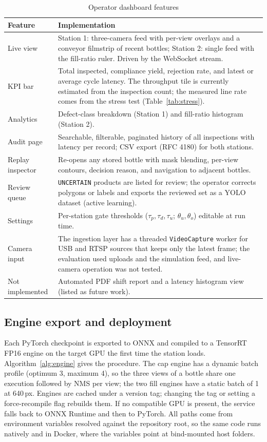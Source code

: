 \begin{table}[htbp]
\centering
\caption{Operator dashboard features}
\label{tab:dashboard}
\footnotesize
\begin{tabularx}{\textwidth}{|p{3.2cm}|X|}
\hline
\textbf{Feature} & \textbf{Implementation} \\ \hline
Live view & Station 1: three-camera feed with per-view overlays and a conveyor filmstrip of recent bottles; Station 2: single feed with the fill-ratio ruler. Driven by the WebSocket stream. \\ \hline
KPI bar & Total inspected, compliance yield, rejection rate, and latest or average cycle latency. The throughput tile is currently estimated from the inspection count; the measured line rate comes from the stress test (Table~\ref{tab:stress}). \\ \hline
Analytics & Defect-class breakdown (Station 1) and fill-ratio histogram (Station 2). \\ \hline
Audit page & Searchable, filterable, paginated history of all inspections with latency per record; CSV export (RFC 4180) for both stations. \\ \hline
Replay inspector & Re-opens any stored bottle with mask blending, per-view contours, decision reason, and navigation to adjacent bottles. \\ \hline
Review queue & \texttt{UNCERTAIN} products are listed for review; the operator corrects polygons or labels and exports the reviewed set as a YOLO dataset (active learning). \\ \hline
Settings & Per-station gate thresholds ($\tau_p,\tau_d,\tau_u$; $\theta_u,\theta_o$) editable at run time. \\ \hline
Camera input & The ingestion layer has a threaded \texttt{VideoCapture} worker for USB and RTSP sources that keeps only the latest frame; the evaluation used uploads and the simulation feed, and live-camera operation was not tested. \\ \hline
Not implemented & Automated PDF shift report and a latency histogram view (listed as future work). \\ \hline
\end{tabularx}
\end{table}

\subsection{Engine export and deployment}
\label{sec:deploy-impl}
Each PyTorch checkpoint is exported to ONNX and compiled to a TensorRT FP16 engine on the target GPU the first time the station loads. Algorithm~\ref{alg:engine} gives the procedure. The cap engine has a dynamic batch profile (optimum 3, maximum 4), so the three views of a bottle share one execution followed by NMS per view; the two fill engines have a static batch of 1 at 640\,px. Engines are cached under a version tag; changing the tag or setting a force-recompile flag rebuilds them. If no compatible GPU is present, the service falls back to ONNX Runtime and then to PyTorch. All paths come from environment variables resolved against the repository root, so the same code runs natively and in Docker, where the variables point at bind-mounted host folders.

